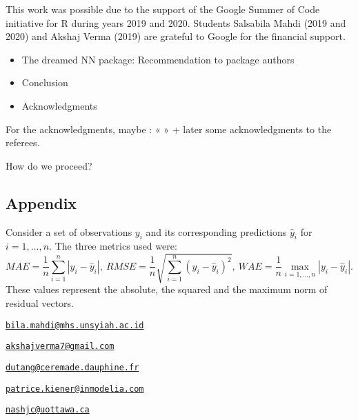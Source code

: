This work was possible due to the support of the Google Summer of Code
initiative for R during years 2019 and 2020. Students Salsabila Mahdi
(2019 and 2020) and Akshaj Verma (2019) are grateful to Google for the
financial support.



\begin{itemize}
\tightlist
\item
  The dreamed NN package: Recommendation to package authors
\item
  Conclusion
\item
  Acknowledgments
\end{itemize}

For the acknowledgments, maybe : « » + later some acknowledgments to the
referees.

How do we proceed?

\hypertarget{appendix}{%
\subsection{Appendix}\label{appendix}}

Consider a set of observations \(y_i\) and its corresponding predictions
\(\hat y_i\) for \(i=1,\dots,n\). The three metrics used were: \[
MAE = \frac1n\sum_{i=1}^n|y_i - \hat y_i|,~
RMSE = \frac1n\sqrt{\sum_{i=1}^n(y_i - \hat y_i)^2},~
WAE = \frac1n\max_{i=1,\dots,n}|y_i - \hat y_i|.
\] These values represent the absolute, the squared and the maximum norm
of residual vectors.


\address{%
Salsabila Mahdi\\
Universitas Syiah Kuala\\
JL. Syech Abdurrauf No.3, Aceh 23111, Indonesia\\
}
\href{mailto:bila.mahdi@mhs.unsyiah.ac.id}{\nolinkurl{bila.mahdi@mhs.unsyiah.ac.id}}

\address{%
Akshaj Verma\\
Manipal Institute of Technology\\
Manipal, Karnataka, 576104, India\\
}
\href{mailto:akshajverma7@gmail.com}{\nolinkurl{akshajverma7@gmail.com}}

\address{%
Christophe Dutang\\
University Paris-Dauphine, University PSL, CNRS, CEREMADE\\
Place du Maréchal de Lattre de Tassigny, 75016 Paris, France\\
}
\href{mailto:dutang@ceremade.dauphine.fr}{\nolinkurl{dutang@ceremade.dauphine.fr}}

\address{%
Patrice Kiener\\
InModelia\\
5 rue Malebranche, 75005 Paris, France\\
}
\href{mailto:patrice.kiener@inmodelia.com}{\nolinkurl{patrice.kiener@inmodelia.com}}

\address{%
John C. Nash\\
Telfer School of Management, University of Ottawa\\
55 Laurier Avenue East, Ottawa, Ontario K1N 6N5 Canada\\
}
\href{mailto:nashjc@uottawa.ca}{\nolinkurl{nashjc@uottawa.ca}}

